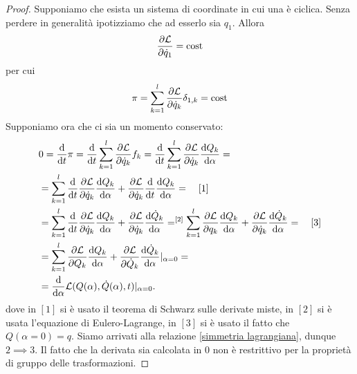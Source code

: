    \begin{proof}
        Supponiamo che esista un sistema di coordinate in cui una è ciclica. Senza perdere in generalità ipotizziamo che ad esserlo sia $q_1$. Allora
       \begin{equation}
           \frac{\partial \mathcal{L}}{\partial \dot{q}_1} =\mathrm{cost}
       \end{equation}
       per cui
       \begin{equation}
           \pi = \sum_{k=1}^l  \frac{\partial \mathcal{L}}{\partial \dot{q}_k}\delta_{1,k}=\mathrm{cost}
       \end{equation}
   Supponiamo ora che ci sia un momento conservato:
   \begin{equation}
       \begin{aligned}
           &0=\frac{\mathrm{d}}{\mathrm{d}t} \pi=\frac{\mathrm{d}}{\mathrm{d}t} \sum_{k=1}^l  \frac{\partial \mathcal{L}}{\partial \dot{q}_k}f_k = \frac{\mathrm{d}}{\mathrm{d}t}\sum_{k=1}^l  \frac{\partial \mathcal{L}}{\partial \dot{q}_k}\frac{\mathrm{d} Q_k}{\mathrm{d} \alpha}=\\
           &=\sum_{k=1}^l  \frac{\mathrm{d}}{\mathrm{d}t} \frac{\partial \mathcal{L}}{\partial \dot{q}_k}\frac{\mathrm{d} Q_k}{\mathrm{d} \alpha}+\frac{\partial \mathcal{L}}{\partial \dot{q}_k}\frac{\mathrm{d}}{\mathrm{d}t}\frac{\mathrm{d} Q_k}{\mathrm{d} \alpha}=\quad[1]\\
           &=\sum_{k=1}^l  \frac{\mathrm{d}}{\mathrm{d}t} \frac{\partial \mathcal{L}}{\partial \dot{q}_k}\frac{\mathrm{d} Q_k}{\mathrm{d} \alpha}+\frac{\partial \mathcal{L}}{\partial \dot{q}_k}\frac{\mathrm{d} \dot{Q}_k}{\mathrm{d} \alpha}=^{[2]}\sum_{k=1}^l  \frac{\partial \mathcal{L}}{\partial q_k}\frac{\mathrm{d} Q_k}{\mathrm{d} \alpha}+\frac{\partial \mathcal{L}}{\partial \dot{q}_k}\frac{\mathrm{d} \dot{Q}_k}{\mathrm{d} \alpha}=\quad[3]\\
           &=\sum_{k=1}^l  \frac{\partial \mathcal{L}}{\partial Q_k}\frac{\mathrm{d} Q_k}{\mathrm{d} \alpha}+\frac{\partial \mathcal{L}}{\partial \dot{Q}_k}\frac{\mathrm{d} \dot{Q}_k}{\mathrm{d} \alpha}|_{\alpha=0}=\\
           &=\frac{\mathrm{d}}{\mathrm{d} \alpha}\mathcal{L}(Q(\alpha),\dot{Q}(\alpha),t)|_{\alpha=0}.
       \end{aligned}
   \end{equation}
   dove in $[1]$ si è usato il teorema di Schwarz sulle derivate miste, in $[2]$ si è usata l'equazione di Eulero-Lagrange, in $[3]$ si è usato il fatto che $Q(\alpha=0)=q$. Siamo arrivati alla relazione \eqref{simmetria lagrangiana}, dunque $2\implies3$. Il fatto che la derivata sia calcolata in $0$ non è restrittivo per la proprietà di gruppo delle trasformazioni.


\end{proof}

